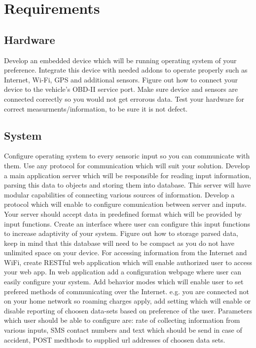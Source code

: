\section{Requirements}

\subsection{Hardware}
Develop an embedded device which will be running operating system of your preference. Integrate this device with needed addons to operate properly such as Internet, Wi-Fi, GPS and additional sensors. Figure out how to connect your device to the vehicle's OBD-II service port. Make sure device and sensors are connected correctly so you would not get errorous data. Test your hardware for correct measurments/information, to be sure it is not defect.
\subsection{System}
Configure operating system to every sensoric input so you can communicate with them. Use any protocol for communication which will suit your solution. Develop a main application server which will be responsible for reading input information, parsing this data to objects and storing them into database. This server will have modular capabilities of connecting various sources of information. Develop a protocol which will enable to configure comunication between server and inputs. Your server should accept data in predefined format which will be provided by input functions. Create an interface where user can configure this input functions to increase adaptivity of your system. Figure out how to storage parsed data, keep in mind that this database will need to be compact as you do not have unlimited space on your device. For accessing information from the Internet and WiFi, create RESTful web application which will enable authorized user to access your web app. In web application add a configuration webpage where user can easily configure your system. Add behavior modes which will enable user to set prefered methods of communicating over the Internet. e.g. you are connected not on your home network so roaming charges apply, add setting which will enable or disable reporting of choosen data-sets based on preference of the user. Parameters which user should be able to configure are: rate of collecting information from various inputs, SMS contact numbers and text which should be send in case of accident, POST medthods to supplied url addresses of choosen data sets.
